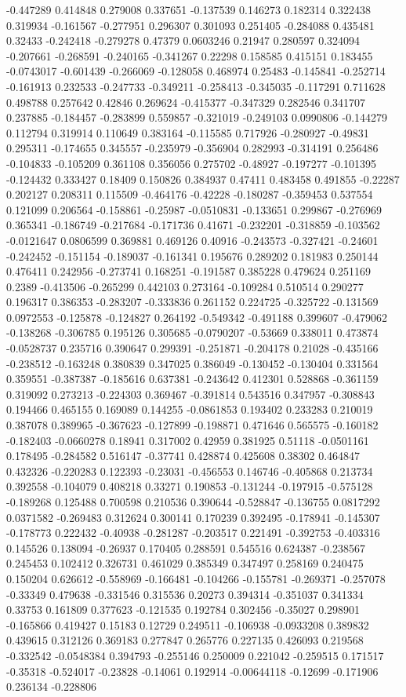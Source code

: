 -0.447289 0.414848 0.279008 0.337651 -0.137539 0.146273 0.182314 0.322438 0.319934 -0.161567 -0.277951 0.296307 0.301093 0.251405 -0.284088 0.435481 0.32433 -0.242418 -0.279278 0.47379 0.0603246 0.21947 0.280597 0.324094 -0.207661 -0.268591 -0.240165 -0.341267 0.22298 0.158585 0.415151 0.183455 -0.0743017 -0.601439 -0.266069 -0.128058 0.468974 0.25483 -0.145841 -0.252714 -0.161913 0.232533 -0.247733 -0.349211 -0.258413 -0.345035 -0.117291 0.711628 0.498788 0.257642 0.42846 0.269624 -0.415377 -0.347329 0.282546 0.341707 0.237885 -0.184457 -0.283899 0.559857 -0.321019 -0.249103 0.0990806 -0.144279 0.112794 0.319914 0.110649 0.383164 -0.115585 0.717926 -0.280927 -0.49831 0.295311 -0.174655 0.345557 -0.235979 -0.356904 0.282993 -0.314191 0.256486 -0.104833 -0.105209 0.361108 0.356056 0.275702 -0.48927 -0.197277 -0.101395 -0.124432 0.333427 0.18409 0.150826 0.384937 0.47411 0.483458 0.491855 -0.22287 0.202127 0.208311 0.115509 -0.464176 -0.42228 -0.180287 -0.359453 0.537554 0.121099 0.206564 -0.158861 -0.25987 -0.0510831 -0.133651 0.299867 -0.276969 0.365341 -0.186749 -0.217684 -0.171736 0.41671 -0.232201 -0.318859 -0.103562 -0.0121647 0.0806599 0.369881 0.469126 0.40916 -0.243573 -0.327421 -0.24601 -0.242452 -0.151154 -0.189037 -0.161341 0.195676 0.289202 0.181983 0.250144 0.476411 0.242956 -0.273741 0.168251 -0.191587 0.385228 0.479624 0.251169 0.2389 -0.413506 -0.265299 0.442103 0.273164 -0.109284 0.510514 0.290277 0.196317 0.386353 -0.283207 -0.333836 0.261152 0.224725 -0.325722 -0.131569 0.0972553 -0.125878 -0.124827 0.264192 -0.549342 -0.491188 0.399607 -0.479062 -0.138268 -0.306785 0.195126 0.305685 -0.0790207 -0.53669 0.338011 0.473874 -0.0528737 0.235716 0.390647 0.299391 -0.251871 -0.204178 0.21028 -0.435166 -0.238512 -0.163248 0.380839 0.347025 0.386049 -0.130452 -0.130404 0.331564 0.359551 -0.387387 -0.185616 0.637381 -0.243642 0.412301 0.528868 -0.361159 0.319092 0.273213 -0.224303 0.369467 -0.391814 0.543516 0.347957 -0.308843 0.194466 0.465155 0.169089 0.144255 -0.0861853 0.193402 0.233283 0.210019 0.387078 0.389965 -0.367623 -0.127899 -0.198871 0.471646 0.565575 -0.160182 -0.182403 -0.0660278 0.18941 0.317002 0.42959 0.381925 0.51118 -0.0501161 0.178495 -0.284582 0.516147 -0.37741 0.428874 0.425608 0.38302 0.464847 0.432326 -0.220283 0.122393 -0.23031 -0.456553 0.146746 -0.405868 0.213734 0.392558 -0.104079 0.408218 0.33271 0.190853 -0.131244 -0.197915 -0.575128 -0.189268 0.125488 0.700598 0.210536 0.390644 -0.528847 -0.136755 0.0817292 0.0371582 -0.269483 0.312624 0.300141 0.170239 0.392495 -0.178941 -0.145307 -0.178773 0.222432 -0.40938 -0.281287 -0.203517 0.221491 -0.392753 -0.403316 0.145526 0.138094 -0.26937 0.170405 0.288591 0.545516 0.624387 -0.238567 0.245453 0.102412 0.326731 0.461029 0.385349 0.347497 0.258169 0.240475 0.150204 0.626612 -0.558969 -0.166481 -0.104266 -0.155781 -0.269371 -0.257078 -0.33349 0.479638 -0.331546 0.315536 0.20273 0.394314 -0.351037 0.341334 0.33753 0.161809 0.377623 -0.121535 0.192784 0.302456 -0.35027 0.298901 -0.165866 0.419427 0.15183 0.12729 0.249511 -0.106938 -0.0933208 0.389832 0.439615 0.312126 0.369183 0.277847 0.265776 0.227135 0.426093 0.219568 -0.332542 -0.0548384 0.394793 -0.255146 0.250009 0.221042 -0.259515 0.171517 -0.35318 -0.524017 -0.23828 -0.14061 0.192914 -0.00644118 -0.12699 -0.171906 0.236134 -0.228806 
